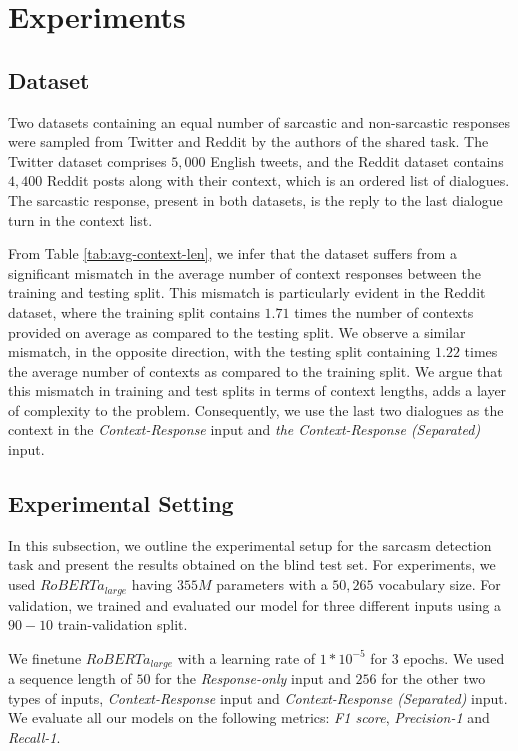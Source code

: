 \documentclass[11pt,a4paper]{article}
\begin{document}
\section{Experiments}

\subsection{Dataset}

Two datasets containing an equal number of sarcastic and non-sarcastic responses were sampled from Twitter and Reddit by the authors of the shared task. The Twitter dataset comprises $5,000$ English tweets, and the Reddit dataset contains $4,400$ Reddit posts along with their context, which is an ordered list of dialogues. The sarcastic response, present in both datasets, is the reply to the last dialogue turn in the context list.

From Table \ref{tab:avg-context-len}, we infer that the dataset suffers from a significant mismatch in the average number of context responses between the training and testing split. This mismatch is particularly evident in the Reddit dataset, where the training split contains $1.71$ times the number of contexts provided on average as compared to the testing split. We observe a similar mismatch, in the opposite direction, with the testing split containing $1.22$ times the average number of contexts as compared to the training split. We argue that this mismatch in training and test splits in terms of context lengths, adds a layer of complexity to the problem. Consequently, we use the last two dialogues as the context in the \textit{Context-Response} input and \textit{the Context-Response (Separated)} input.


\subsection{Experimental Setting}
In this subsection, we outline the experimental setup for the sarcasm detection task and present the results obtained on the blind test set. For experiments, we used $RoBERTa_{large}$ having $355M$ parameters with a $50,265$ vocabulary size. For validation, we trained and evaluated our model for three different inputs using a $90-10$ train-validation split.

We finetune $RoBERTa_{large}$ with a learning rate of $1*10^{-5}$ for 3 epochs. We used a sequence length of $50$ for the \textit{Response-only} input and $256$ for the other two types of inputs, \textit{Context-Response} input and \textit{Context-Response (Separated)} input. We evaluate all our models on the following metrics: \textit{F1 score}, \textit{Precision-1} and \textit{Recall-1}.
\end{document}
